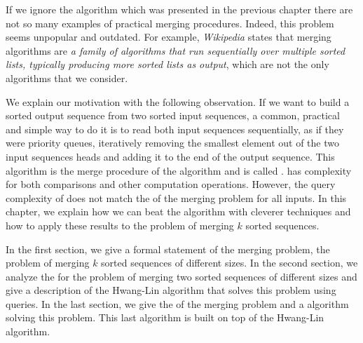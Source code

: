\label{tree:merging:intro}

If we ignore the \mergesort algorithm which was presented in
the previous chapter there are not so many examples of practical merging
procedures. Indeed, this problem seems unpopular and outdated. For example,
\emph{Wikipedia} states that merging algorithms are \emph{a family of algorithms
that run sequentially over multiple sorted lists, typically producing more
sorted lists as output}, which are not the only algorithms that we
consider.

We explain our motivation with the following observation.
If we want to build a sorted output sequence from two sorted input sequences, a
common, practical and simple way to do it is to read both input sequences
sequentially, as if they were priority queues, iteratively removing the
smallest element out of the two input sequences heads and adding it to the end
of the output sequence. This algorithm is the merge procedure of the \mergesort
algorithm and is called \tapemerge. \tapemerge has  complexity for
both comparisons and other computation operations. However, the query
complexity of \tapemerge does not match the \ITLB of the merging problem for all
inputs. In this chapter, we explain how we can beat the \tapemerge algorithm
with cleverer techniques and how to apply these results to the problem of
merging \(k\) sorted sequences.

In the first section, we give a formal statement of the merging problem, \ie
the problem of merging \(k\) sorted sequences of different sizes. In the second
section, we analyze the \ITLB for the problem of merging two sorted sequences of
different sizes and give a description of the Hwang-Lin algorithm
\cite{DBLP:journals/siamcomp/HwangL72} that solves this problem using
\BigO{\ITLB} queries. In the last section, we give the \ITLB of the merging
problem and a \BigO{\ITLB} algorithm solving this problem. This last
algorithm is built on top of the Hwang-Lin algorithm.
